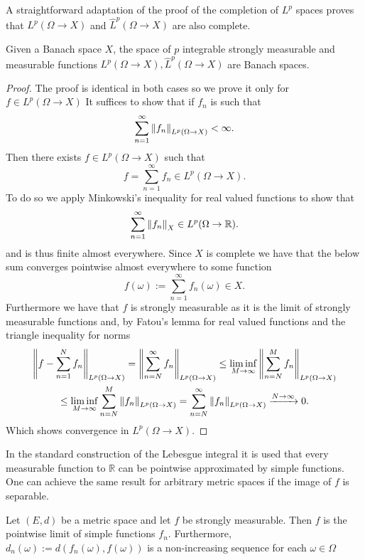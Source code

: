 \documentclass[
    a4paper,
    DIV=14,
    abstract=true,
    numbers=noenddot
]{scrartcl}
\begin{document}
A straightforward adaptation of the proof of the completion of $L^p$ spaces proves that $L^p(\Omega\to X)$ and $\hat{L}^p(\Omega\to X)$ are also complete.
\begin{proposition}
	Given a Banach space $X$, the space of $p$ integrable strongly measurable and measurable functions $L^p(\Omega\to X),\hat{L}^p(\Omega\to X)$ are Banach spaces.
\end{proposition}
\begin{proof}
	The proof is identical in both cases so we prove it only for $f\in L^p(\Omega\to X)$
	It suffices to show that if $f_n$ is such that
	\begin{equation*}
		\sum_{n=1}^\infty \left\lVert f_n \right\rVert_{L^p(\Omega\to X)}<\infty.
	\end{equation*}
	Then there exists $f\in L^p(\Omega\to X)$ such that
	\begin{equation*}
		f=\sum_{n=1}^\infty f_n\in L^p(\Omega\to X).
	\end{equation*}
	To do so we apply Minkowski's inequality for real valued functions to show that
	\begin{equation*}
		\sum_{n=1}^\infty \left\lVert f_n \right\rVert_X\in L^p(\Omega\to\mathbb{R}).
	\end{equation*}
	and is thus finite almost everywhere. Since $X$ is complete we have that the below sum converges pointwise almost everywhere to some function
	\begin{equation*}
		f(\omega):=\sum_{n=1}^\infty f_n(\omega)\in X.
	\end{equation*}
	Furthermore we have that $f$ is strongly measurable as it is the limit of strongly measurable functions and, by Fatou's lemma for real valued functions and the triangle inequality for norms
	\begin{multline*}
		\left\lVert f-\sum_{n=1}^N f_n \right\rVert_{L^p(\Omega\to X)}=\left\lVert \sum_{n=N}^\infty f_n \right\rVert_{L^p(\Omega\to X)}\leq \liminf_{M\to \infty}\left\lVert \sum_{n=N}^M f_n \right\rVert_{L^p(\Omega\to X)}\\\leq \liminf_{M\to \infty}\sum_{n=N}^M \left\lVert f_n \right\rVert_{L^p(\Omega\to X)}=\sum_{n=N}^\infty \left\lVert f_n \right\rVert_{L^p(\Omega\to X)}\xrightarrow{N\to\infty} 0.
	\end{multline*}
	Which shows convergence in $L^p(\Omega\to X)$.
\end{proof}
In the standard construction of the Lebesgue integral it is used that every measurable function to $\mathbb{R}$ can be pointwise approximated by simple functions. One can achieve the same result for arbitrary metric spaces if the image of $f$ is separable.
\begin{lemma}
	Let $(E,d)$ be a metric space and let $f$ be strongly measurable. Then $f$ is the pointwise limit of simple functions $f_n$. Furthermore, \\$d_n(\omega):=d(f_n(\omega),f(\omega))$ is a non-increasing sequence for each $\omega\in\Omega$
\end{lemma}
\end{document}
